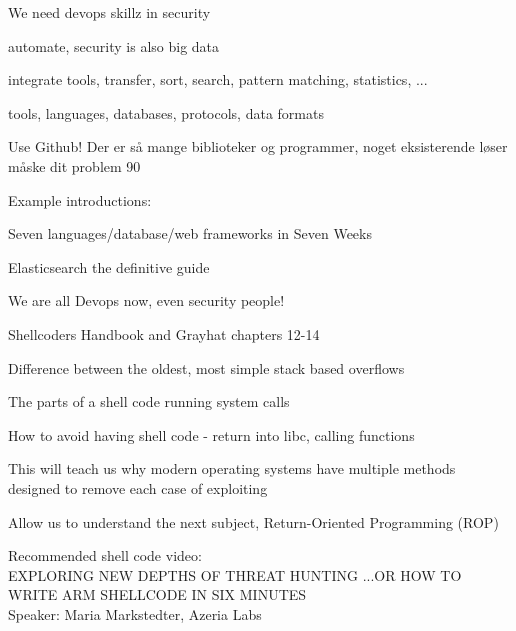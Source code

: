 \documentclass[Screen16to9,17pt]{foils}
\begin{document}
\begin{list1}
\item We need devops skillz in security
\item automate, security is also big data
\item integrate tools, transfer, sort, search, pattern matching, statistics, ...
\item tools, languages, databases, protocols, data formats
\item Use Github! Der er så mange biblioteker og programmer, noget eksisterende løser måske dit problem 90%
\item Example introductions:
\begin{list2}
\item Seven languages/database/web frameworks in Seven Weeks
\item Elasticsearch the definitive guide
\end{list2}
\end{list1}

\centerline{We are all Devops now, even security people!}


\myquestionspage




\begin{list1}
\item Shellcoders Handbook  and Grayhat chapters 12-14
\item Difference between the oldest, most simple stack based overflows
\item The parts of a shell code running system calls
\item How to avoid having shell code - return into libc, calling functions
\item This will teach us why modern operating systems have multiple methods designed to remove each case of exploiting
\item Allow us to understand the next subject, Return-Oriented Programming (ROP)
\end{list1}

Recommended shell code video:\\
EXPLORING NEW DEPTHS OF THREAT HUNTING ...OR HOW TO WRITE ARM SHELLCODE IN SIX MINUTES\\
Speaker: Maria Markstedter, Azeria Labs\\


\end{document}

